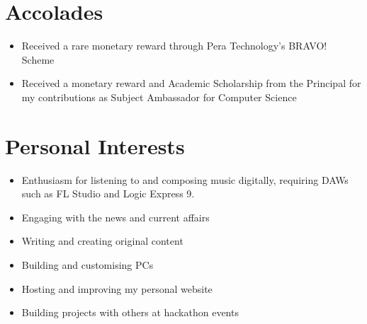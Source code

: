 \documentclass{article}
\begin{document}
\section*{Accolades}
\begin{itemize}
	\item Received a rare monetary reward through Pera Technology's BRAVO! Scheme
	\item Received a monetary reward and Academic Scholarship from the Principal for my contributions as Subject Ambassador for Computer Science
\end{itemize}
\section*{Personal Interests}
\begin{itemize}
	\item Enthusiasm for listening to and composing music digitally, requiring DAWs such as FL Studio and Logic Express 9.
	\item Engaging with the news and current affairs
	\item Writing and creating original content
	\item Building and customising PCs
	\item Hosting and improving my personal website
	\item Building projects with others at hackathon events
\end{itemize}
\end{document}
